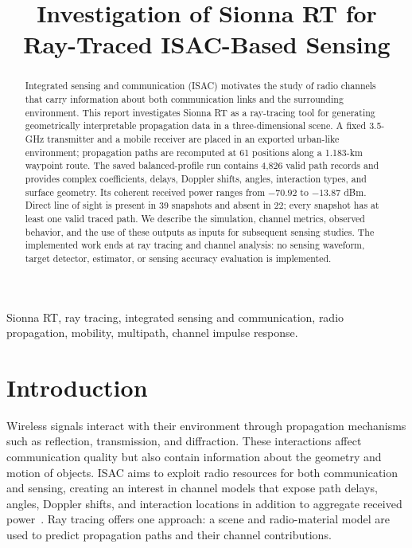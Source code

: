 \documentclass[conference]{IEEEtran}
\begin{document}
\title{Investigation of Sionna RT for Ray-Traced ISAC-Based Sensing}
\author{}
\maketitle
\begin{abstract}
Integrated sensing and communication (ISAC) motivates the study of radio channels that carry information about both communication links and the surrounding environment. This report investigates Sionna RT as a ray-tracing tool for generating geometrically interpretable propagation data in a three-dimensional scene. A fixed 3.5-GHz transmitter and a mobile receiver are placed in an exported urban-like environment; propagation paths are recomputed at 61 positions along a 1.183-km waypoint route. The saved balanced-profile run contains 4,826 valid path records and provides complex coefficients, delays, Doppler shifts, angles, interaction types, and surface geometry. Its coherent received power ranges from $-70.92$ to $-13.87$ dBm. Direct line of sight is present in 39 snapshots and absent in 22; every snapshot has at least one valid traced path. We describe the simulation, channel metrics, observed behavior, and the use of these outputs as inputs for subsequent sensing studies. The implemented work ends at ray tracing and channel analysis: no sensing waveform, target detector, estimator, or sensing accuracy evaluation is implemented.
\end{abstract}
\begin{IEEEkeywords}
Sionna RT, ray tracing, integrated sensing and communication, radio propagation, mobility, multipath, channel impulse response.
\end{IEEEkeywords}

\section{Introduction}
Wireless signals interact with their environment through propagation mechanisms such as reflection, transmission, and diffraction. These interactions affect communication quality but also contain information about the geometry and motion of objects. ISAC aims to exploit radio resources for both communication and sensing, creating an interest in channel models that expose path delays, angles, Doppler shifts, and interaction locations in addition to aggregate received power~\cite{liu2022}. Ray tracing offers one approach: a scene and radio-material model are used to predict propagation paths and their channel contributions.
\end{document}
